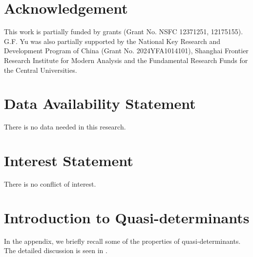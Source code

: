 \documentclass[11p,reqno]{amsart}
\numberwithin{equation}{section}
\numberwithin{equation}{section}
\begin{document}
\section*{Acknowledgement}
This work is partially funded by grants (Grant No. NSFC 12371251, 12175155). G.F. Yu was also partially supported by the National Key Research and Development Program of China (Grant No. 2024YFA1014101), Shanghai Frontier Research Institute for Modern Analysis and the Fundamental Research Funds for the Central Universities.

\section*{Data Availability Statement}
There is no data needed in this research.

\section*{Interest Statement}
There is no conflict of interest.

\appendix
\section{Introduction to Quasi-determinants}
\noindent In the appendix, we briefly recall some of the properties of quasi-determinants. The detailed discussion is seen in \cite{gelfand91,gelfand05}.
\end{document}
